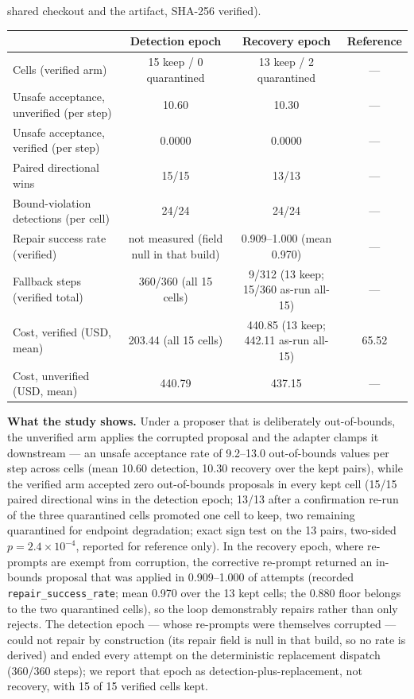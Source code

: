 \documentclass[11pt,a4paper]{article}
\begin{document}
\begin{table}[htbp]
{shared checkout and the artifact, SHA-256 verified).}
\label{tab:m2b}
\begin{tabular}{lccc}
\toprule
 & Detection epoch & Recovery epoch & Reference \\
\midrule
Cells (verified arm) & 15 keep / 0 quarantined & 13 keep / 2 quarantined & --- \\
Unsafe acceptance, unverified (per step) & 10.60 & 10.30 & --- \\
Unsafe acceptance, verified (per step) & 0.0000 & 0.0000 & --- \\
Paired directional wins & 15/15 & 13/13 & --- \\
Bound-violation detections (per cell) & 24/24 & 24/24 & --- \\
Repair success rate (verified) & not measured (field null in that build) & 0.909--1.000 (mean 0.970) & --- \\
Fallback steps (verified total) & 360/360 (all 15 cells) & 9/312 (13 keep; 15/360 as-run all-15) & --- \\
Cost, verified (USD, mean) & 203.44 (all 15 cells) & 440.85 (13 keep; 442.11 as-run all-15) & 65.52 \\
Cost, unverified (USD, mean) & 440.79 & 437.15 & --- \\
\bottomrule
\end{tabular}
\end{table}

\textbf{What the study shows.} Under a proposer that is deliberately
out-of-bounds, the unverified arm applies the corrupted proposal and the
adapter clamps it downstream --- an unsafe acceptance rate of 9.2--13.0
out-of-bounds values per step across cells (mean 10.60 detection, 10.30
recovery over the kept pairs), while the verified arm accepted zero
out-of-bounds proposals in every kept cell (15/15 paired directional wins in
the detection epoch; 13/13 after a confirmation re-run of the three
quarantined cells promoted one cell to keep, two remaining quarantined for
endpoint degradation; exact sign test on the 13 pairs, two-sided $p = 2.4
\times 10^{-4}$, reported for reference only). In the recovery epoch, where
re-prompts are exempt from corruption, the corrective re-prompt returned an
in-bounds proposal that was applied in 0.909--1.000 of attempts (recorded
\texttt{repair\_success\_rate}; mean 0.970 over the 13 kept cells; the 0.880
floor belongs to the two quarantined cells), so the loop demonstrably repairs
rather than only rejects. The detection epoch --- whose re-prompts were
themselves corrupted --- could not repair by construction (its repair field
is null in that build, so no rate is derived) and ended every attempt on the
deterministic replacement dispatch (360/360 steps); we report that epoch as
detection-plus-replacement, not recovery, with 15 of 15 verified cells kept.
\end{document}
